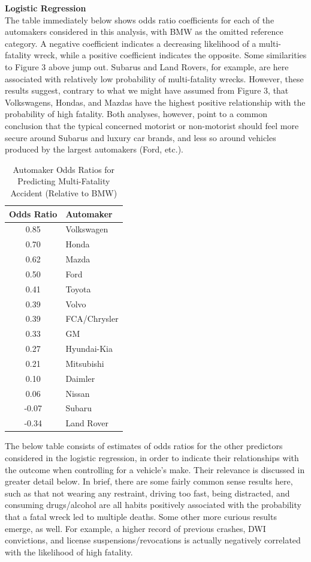 \documentclass[11pt, oneside,titlepage]{article}   	%
\begin{document}
\textbf{Logistic Regression} \\
The table immediately below shows odds ratio coefficients for each of the automakers considered in this analysis, with BMW as the omitted reference category. A negative coefficient indicates a decreasing likelihood of a multi-fatality wreck, while a positive coefficient indicates the opposite. Some similarities to Figure 3 above jump out. Subarus and Land Rovers, for example, are here associated with relatively low probability of multi-fatality wrecks. However, these results suggest, contrary to what we might have assumed from Figure 3, that Volkswagens, Hondas, and Mazdas have the highest positive relationship with the probability of high fatality. Both analyses, however, point to a common conclusion that the typical concerned motorist or non-motorist should feel more secure around Subarus and luxury car brands, and less so around vehicles produced by the largest automakers (Ford, etc.). 

\begin{table}[H]
\centering
\begin{tabular}{cl}
  \hline
 Odds Ratio & Automaker \\ 
  \hline
  0.85 & Volkswagen \\ 
  0.70 & Honda \\ 
  0.62 & Mazda \\ 
  0.50 & Ford \\ 
  0.41 & Toyota \\ 
  0.39 & Volvo \\ 
  0.39 & FCA/Chrysler \\ 
  0.33 & GM \\ 
  0.27 & Hyundai-Kia \\ 
  0.21 & Mitsubishi \\ 
  0.10 & Daimler \\ 
  0.06 & Nissan \\ 
  -0.07 & Subaru \\ 
  -0.34 & Land Rover \\ 
   \hline
\end{tabular}
\caption{Automaker Odds Ratios for Predicting Multi-Fatality Accident (Relative to BMW)} 
\end{table}

The below table consists of estimates of odds ratios for the other predictors considered in the logistic regression, in order to indicate their relationships with the outcome when controlling for a vehicle's make. Their relevance is discussed in greater detail below. In brief, there are some fairly common sense results here, such as that not wearing any restraint, driving too fast, being distracted, and consuming drugs/alcohol are all habits positively associated with the probability that a fatal wreck led to multiple deaths. Some other more curious results emerge, as well. For example, a higher record of previous crashes, DWI convictions, and license suspensions/revocations is actually negatively correlated with the likelihood of high fatality.
\end{document}
